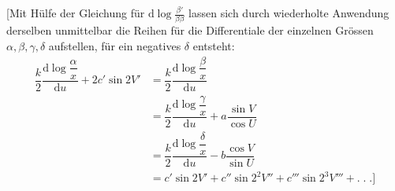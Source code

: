 [Mit Hülfe der Gleichung für $\mathrm{d}\log\frac{\beta'}{\beta\beta}$ lassen sich durch wiederholte Anwendung
derselben unmittelbar die Reihen für die Differentiale der einzelnen Grössen $\alpha,\allowbreak \beta,\allowbreak \gamma,\allowbreak \delta$ aufstellen,
für ein negatives $\delta$ entsteht:
\[
\begin{aligned}\dfrac{k}{2}\dfrac{\mathrm{d}\log\dfrac{\alpha}{x}}{\mathrm{d}u}+2c'\sin 2V'
&=\dfrac{k}{2}\dfrac{\mathrm{d}\log\dfrac{\beta}{x}}{\mathrm{d}u}
\\[7pt]&=\dfrac{k}{2}\dfrac{\mathrm{d}\log\dfrac{\gamma}{x}}{\mathrm{d}u}+a\dfrac{\sin V}{\cos U}
\\[7pt]&=\dfrac{k}{2}\dfrac{\mathrm{d}\log\dfrac{\delta}{x}}{\mathrm{d}u}-b\dfrac{\cos V}{\sin U}
\\[7pt]&=c'\sin 2V'+c''\sin 2^2V''+c'''\sin 2^3V'''+.\;.\;.\text{]}\end{aligned}
\]


